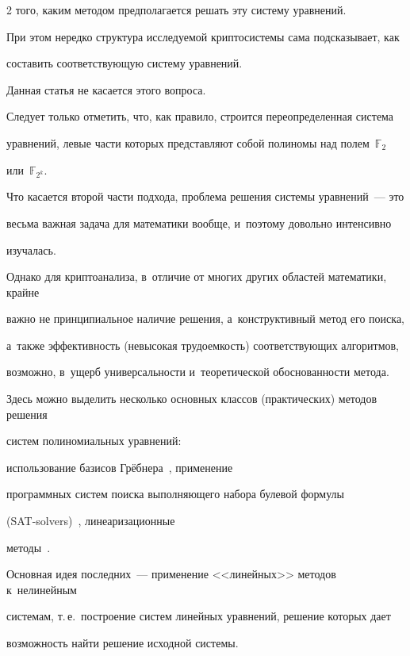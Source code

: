 \begin{multicols}{2}
того, каким методом предполагается решать эту систему уравнений.


При этом нередко структура исследуемой криптосистемы сама подсказывает, как 


составить соответствующую систему уравнений.


Данная статья не касается этого вопроса.


Следует только отметить, что, как правило, строится переопределенная система 


уравнений, левые части которых представляют собой полиномы над полем~$\mathbb{F}_2$ 


или~$\mathbb{F}_{2^k}$.





Что касается второй части подхода, проблема решения системы уравнений~--- это 


весьма важная задача для математики вообще, и~поэтому довольно интенсивно 


изучалась.


Однако для криптоанализа, в~отличие от многих других областей математики, крайне 


важно не принципиальное наличие решения, а~конструктивный метод его поиска, 


а~также эффективность (невысокая трудоемкость) соответствующих алгоритмов, 


возможно, в~ущерб универсальности и~теоретической обоснованности ме\-тода.











Здесь можно выделить несколько основных классов (практических) методов решения 


систем полиномиальных уравнений:


использование базисов Грёбнера~\cite[разд.~12.2]{Bard2009}, применение 


про\-граммных систем поиска выполняющего набора булевой формулы 


(SAT-solvers)~\cite{BCJ2007}, линеаризационные 


методы~\cite[разд.~12.3]{Bard2009}.


Основная идея последних~--- применение <<линейных>> методов к~нелинейным 


сис\-те\-мам, т.\,е.\ построение сис\-тем линейных уравнений, решение которых дает 


воз\-мож\-ность найти решение исходной сис\-темы.






\end{multicols}

